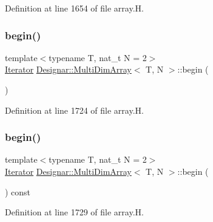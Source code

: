 Definition at line 1654 of file array.\+H.

\mbox{\label{class_designar_1_1_multi_dim_array_adaed0d8dcdb5500e751f27418e914c4d}} 
\subsubsection{\texorpdfstring{begin()}{begin()}\hspace{0.1cm}{\footnotesize\ttfamily [1/2]}}
{\footnotesize\ttfamily template$<$typename T, nat\+\_\+t N = 2$>$ \\
\hyperlink{class_designar_1_1_multi_dim_array_1_1_iterator}{Iterator} \hyperlink{class_designar_1_1_multi_dim_array}{Designar\+::\+Multi\+Dim\+Array}$<$ T, N $>$\+::begin (\begin{DoxyParamCaption}{ }\end{DoxyParamCaption})\hspace{0.3cm}{\ttfamily [inline]}}



Definition at line 1724 of file array.\+H.

\mbox{\label{class_designar_1_1_multi_dim_array_ad3760c3ce200ee63585ab7c7841b433d}} 
\subsubsection{\texorpdfstring{begin()}{begin()}\hspace{0.1cm}{\footnotesize\ttfamily [2/2]}}
{\footnotesize\ttfamily template$<$typename T, nat\+\_\+t N = 2$>$ \\
\hyperlink{class_designar_1_1_multi_dim_array_1_1_iterator}{Iterator} \hyperlink{class_designar_1_1_multi_dim_array}{Designar\+::\+Multi\+Dim\+Array}$<$ T, N $>$\+::begin (\begin{DoxyParamCaption}{ }\end{DoxyParamCaption}) const\hspace{0.3cm}{\ttfamily [inline]}}



Definition at line 1729 of file array.\+H.

